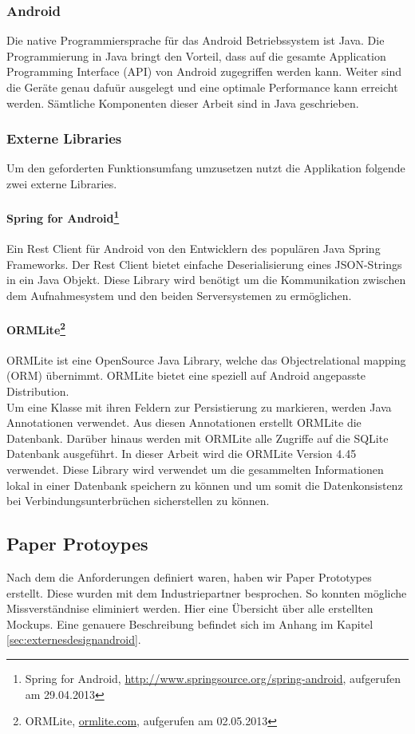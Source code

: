 \subsubsection{Android}
Die native Programmiersprache f\"{u}r das Android Betriebssystem ist Java. Die Programmierung in Java bringt den Vorteil, dass auf die gesamte Application Programming Interface (API) von Android zugegriffen werden kann. Weiter sind die Ger\"{a}te genau dafu\"{u}r ausgelegt und eine optimale Performance kann erreicht werden. S\"{a}mtliche Komponenten dieser Arbeit sind in Java geschrieben.

\subsubsection{Externe Libraries}
Um den geforderten Funktionsumfang umzusetzen nutzt die Applikation folgende zwei externe Libraries.
\paragraph{Spring for Android\footnote{Spring for Android, \url{http://www.springsource.org/spring-android}, aufgerufen am 29.04.2013} }
Ein Rest Client für Android von den Entwicklern des populären Java Spring Frameworks. Der Rest Client bietet einfache Deserialisierung eines JSON-Strings in ein Java Objekt. Diese Library wird benötigt um die Kommunikation zwischen dem Aufnahmesystem und den beiden Serversystemen zu ermöglichen.
\paragraph{ORMLite\footnote{ORMLite, \url{ormlite.com}, aufgerufen am 02.05.2013}} ORMLite ist eine OpenSource Java Library, welche das Objectrelational mapping
(ORM) übernimmt. ORMLite bietet eine speziell auf Android angepasste Distribution.\\
Um eine Klasse mit ihren Feldern zur Persistierung zu markieren, werden Java Annotationen verwendet. Aus diesen Annotationen erstellt ORMLite die Datenbank. Darüber hinaus werden mit ORMLite alle Zugriffe auf die SQLite Datenbank ausgeführt. In dieser Arbeit wird die ORMLite Version 4.45 verwendet. Diese Library wird verwendet um die gesammelten Informationen lokal in einer Datenbank speichern zu können und um somit die Datenkonsistenz bei Verbindungsunterbrüchen sicherstellen zu können.

\subsection{Paper Protoypes}
Nach dem die Anforderungen definiert waren, haben wir Paper Prototypes erstellt. Diese wurden mit dem Industriepartner besprochen. So konnten mögliche Missverständnise eliminiert werden. Hier eine Übersicht über alle erstellten Mockups. Eine genauere Beschreibung befindet sich im Anhang im Kapitel \ref{sec:externesdesignandroid}.

